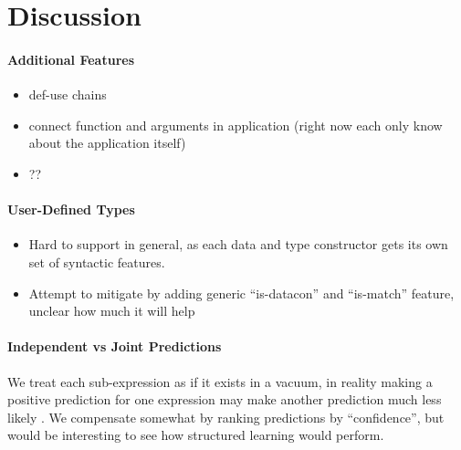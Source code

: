 \section{Discussion}
\label{sec:discussion}

\paragraph{Additional Features}
\begin{itemize}
\item def-use chains
\item connect function and arguments in application (right now each only know about the application itself)
\item ??
\end{itemize}

\paragraph{User-Defined Types}
\begin{itemize}
\item Hard to support in general, as each data and type constructor gets
  its own set of syntactic features.
\item Attempt to mitigate by adding generic ``is-datacon'' and
  ``is-match'' feature, unclear how much it will help
\end{itemize}

\paragraph{Independent vs Joint Predictions}
We treat each sub-expression as if it exists in a vacuum, in reality
making a positive prediction for one expression may make another
prediction much less likely \citep{Raychev2015-jg}. We compensate
somewhat by ranking predictions by ``confidence'', but would be
interesting to see how structured learning would perform.




